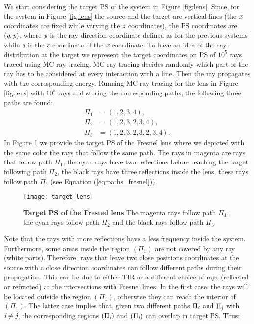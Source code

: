 \\ \indent
We start considering the target PS of the system in Figure \ref{fig:lens}. Since, for the system in Figure \ref{fig:lens} the source and the target are vertical lines (the $\textit{x}$ coordinates are fixed while varying the $\textit{z}$ coordinates), the PS coordinates are $(\textit{q}, \textit{p})$, where  $\textit{p}$ is the ray direction coordinate defined as for the previous systems while $\textit{q}$ is the $\textit{z}$ coordinate of the $\textit{x}$ coordinate. To have an idea of the rays distribution at the target we represent the target coordinates on PS of $10^5$ rays traced using MC ray tracing. MC ray tracing decides randomly which part of the ray has to be considered at every interaction with a line. Then the ray propagates with the corresponding energy. Running MC ray tracing for the lens in Figure \ref{fig:lens} with $10^5$ rays and storing the corresponding paths, the following three paths are found:
\begin{equation}\label{eq:paths_fresnel}
\begin{aligned}
\Pi_1 & = (1,2,3,4),\\
\Pi_2 & = (1,2,3,2,3,4), \\
\Pi_3 & = (1,2,3,2,3,2,3,4).
\end{aligned}
\end{equation}
In Figure \ref{fig:target_PS_lens} we provide the target PS of the Fresnel lens where we depicted with the same color the rays that follow the same path. The rays in magenta are rays that follow path $\Pi_1$, the cyan rays have two reflections before reaching the target following path $\Pi_2$, the black rays have three reflections inside the lens, these rays follow path $\Pi_3$ (see Equation (\ref{eq:paths_fresnel})).
\begin{figure}[t]
  \begin{center}
  \texttt{[image: target\_lens]}
  \end{center}
  \caption{\textbf{Target PS of the Fresnel lens}
The magenta rays follow path $\Pi_1$, the cyan rays follow path $\Pi_2$ and the black rays follow path $\Pi_3$.}
\label{fig:target_PS_lens}
 \end{figure}
Note that the rays with more reflections have a less frequency inside the system. Furthermore, some areas inside the region $(\Pi_1)$ are not covered by any ray (white parts). Therefore, rays that leave two close positions coordinates at the source with a close direction coordinates can follow different paths during their propagation. This can be due to either TIR or a different choice of rays (reflected or refracted) at the intersections with Fresnel lines. In the first case, the rays will be located outside the region $(\Pi_1)$, otherwise they can reach the interior of $(\Pi_1)$. The latter case implies that, given two different paths $\Pi_{\textit{i}}$ and $\Pi_{\textit{j}}$ with $\textit{i}\neq\textit{j}$, the corresponding regions $(\Pi_{\textit{i}})$ and $(\Pi_{\textit{j}})$ can overlap in target PS. Thus:
